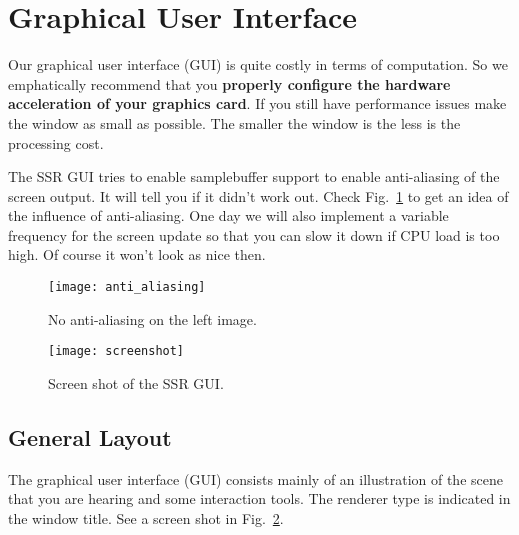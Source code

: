 \section{Graphical User Interface}
\label{sec:gui}
%
Our graphical user interface (GUI) is quite costly in terms of
computation. So we emphatically recommend that you {\bf properly
configure the hardware acceleration of your graphics card}.
If you still have performance
issues make the window as small as possible. The smaller
the window is the less is the processing cost.

The SSR GUI tries to enable samplebuffer support to enable
anti-aliasing of the screen output. It will tell you if it didn't
work out. Check Fig.~\ref{fig:anti_aliasing} to get an idea of
the influence of anti-aliasing.
%
One day we will also implement a variable frequency for the
screen update so that you can slow it down if CPU load is too high. Of course it
won't look as nice then.

\begin{figure}[htbp]
\begin{center}
\texttt{[image: anti\_aliasing]}
\caption{\label{fig:anti_aliasing}{No anti-aliasing on the left image.}}
\end{center}
\end{figure}

\begin{figure}[!t]%
\begin{center}
\texttt{[image: screenshot]}
\caption{\label{fig:screenshot}{Screen shot of the SSR GUI.
}}
\end{center}
\end{figure}
%
\subsection{General Layout}

The graphical user interface (GUI) consists mainly of an
illustration of the scene that you are hearing and some interaction
tools. The renderer type is indicated in the window title.
See a screen shot in Fig.~\ref{fig:screenshot}.

